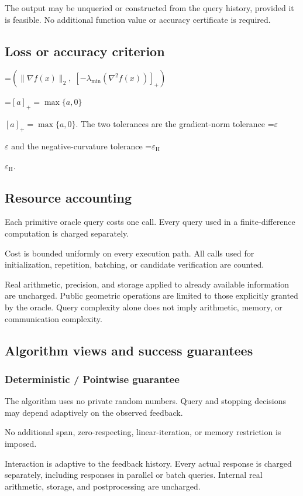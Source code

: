 \documentclass[10pt,a4paper]{article}
\newcommand{\AtlasMath}[1]{\par\begingroup\centering\setbox0=\hbox{$\displaystyle #1$}\ifdim\wd0>1.4\linewidth\typeout{ATLAS WIDE FORMULA: \the\wd0}\fi\ifdim\wd0>\linewidth\resizebox{\linewidth}{!}{\box0}\else\box0\fi\par\endgroup}
\newcommand{\AtlasInlineMath}[1]{\begingroup\setbox0=\hbox{$#1$}\ifdim\wd0>.4\linewidth\endgroup\AtlasMath{#1}\else\endgroup$#1$\fi}
\begin{document}
The output may be unqueried or constructed from the query history, provided it is feasible. No additional function value or accuracy certificate is required.

\subsection{Loss or accuracy criterion}

\AtlasMath{(\|\nabla f(x)\|_2,\;[-\lambda_{\min}(\nabla^2 f(x))]_+)}


\AtlasInlineMath{[a]_+=\max\{a,0\}}. The two tolerances are the gradient-norm tolerance \AtlasInlineMath{\varepsilon} and the negative-curvature tolerance \AtlasInlineMath{\varepsilon_{\mathrm H}}.

\subsection{Resource accounting}
Each primitive oracle query costs one call. Every query used in a finite-difference computation is charged separately.

Cost is bounded uniformly on every execution path. All calls used for initialization, repetition, batching, or candidate verification are counted.

Real arithmetic, precision, and storage applied to already available information are uncharged. Public geometric operations are limited to those explicitly granted by the oracle. Query complexity alone does not imply arithmetic, memory, or communication complexity.

\subsection{Algorithm views and success guarantees}
\subsubsection{Deterministic / Pointwise guarantee}
The algorithm uses no private random numbers. Query and stopping decisions may depend adaptively on the observed feedback.

No additional span, zero-respecting, linear-iteration, or memory restriction is imposed.

Interaction is adaptive to the feedback history. Every actual response is charged separately, including responses in parallel or batch queries. Internal real arithmetic, storage, and postprocessing are uncharged.
\end{document}
